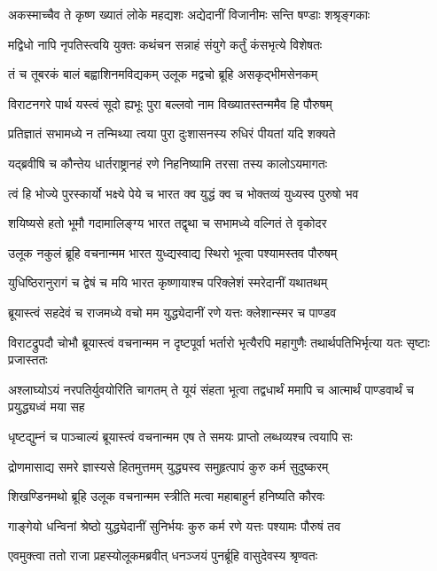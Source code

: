 \twolineshloka
{अकस्माच्चैव ते कृष्ण ख्यातं लोके महद्यशः}
{अद्येदानीं विजानीमः सन्ति षण्डाः शश्रृङ्गकाः}


\twolineshloka
{मद्विधो नापि नृपतिस्त्वयि युक्तः कथंचन}
{सन्नाहं संयुगे कर्तुं कंसभृत्ये विशेषतः}


\twolineshloka
{तं च तूबरकं बालं बह्वाशिनमविद्यकम्}
{उलूक मद्वचो ब्रूहि असकृद्भीमसेनकम्}


\twolineshloka
{विराटनगरे पार्थ यस्त्वं सूदो ह्यभूः पुरा}
{बल्लवो नाम विख्यातस्तन्ममैव हि पौरुषम्}


\twolineshloka
{प्रतिज्ञातं सभामध्ये न तन्मिथ्या त्वया पुरा}
{दुःशासनस्य रुधिरं पीयतां यदि शक्यते}


\twolineshloka
{यद्ब्रवीषि च कौन्तेय धार्तराष्ट्रानहं रणे}
{निहनिष्यामि तरसा तस्य कालोऽयमागतः}


\twolineshloka
{त्वं हि भोज्ये पुरस्कार्यो भक्ष्ये पेये च भारत}
{क्व युद्धं क्व च भोक्तव्यं युध्यस्व पुरुषो भव}


\twolineshloka
{शयिष्यसे हतो भूमौ गदामालिङ्ग्य भारत}
{तद्वृथा च सभामध्ये वल्गितं ते वृकोदर}


\twolineshloka
{उलूक नकुलं ब्रूहि वचनान्मम भारत}
{युध्द्यस्वाद्य स्थिरो भूत्वा पश्यामस्तव पौरुषम्}


\twolineshloka
{युधिष्ठिरानुरागं च द्वेषं च मयि भारत}
{कृष्णायाश्च परिक्लेशं स्मरेदानीं यथातथम्}


\twolineshloka
{ब्रूयास्त्वं सहदेवं च राजमध्ये वचो मम}
{युद्ध्येदानीं रणे यत्तः क्लेशान्स्मर च पाण्डव}


\threelineshloka
{विराटद्रुपदौ चोभौ ब्रूयास्त्वं वचनान्मम}
{न दृष्टपूर्वा भर्तारो भृत्यैरपि महागुणैः}
{तथार्थपतिभिर्भृत्या यतः सृष्टाः प्रजास्ततः}


अश्लाघ्योऽयं नरपतिर्युवयोरिति चागतम्
\twolineshloka
{ते यूयं संहता भूत्वा तद्वधार्थं ममापि च}
{आत्मार्थं पाण्डवार्थं च प्रयुद्ध्यध्वं मया सह}


\twolineshloka
{धृष्टद्युम्नं च पाञ्चाल्यं ब्रूयास्त्वं वचनान्मम}
{एष ते समयः प्राप्तो लब्धव्यश्च त्वयापि सः}


\twolineshloka
{द्रोणमासाद्य समरे ज्ञास्यसे हितमुत्तमम्}
{युद्ध्यस्व समुहृत्पापं कुरु कर्म सुदुष्करम्}


\twolineshloka
{शिखण्डिनमथो ब्रूहि उलूक वचनान्मम}
{स्त्रीति मत्वा महाबाहुर्न हनिष्यति कौरवः}


\twolineshloka
{गाङ्गेयो धन्विनां श्रेष्ठो युद्ध्येदानीं सुनिर्भयः}
{कुरु कर्म रणे यत्तः पश्यामः पौरुषं तव}


\twolineshloka
{एवमुक्त्वा ततो राजा प्रहस्योलूकमब्रवीत्}
{धनञ्जयं पुनर्ब्रूहि वासुदेवस्य श्रृण्वतः}


